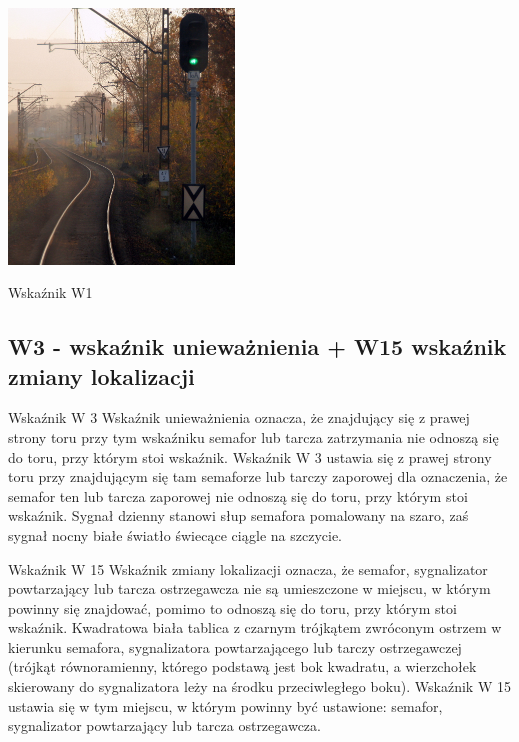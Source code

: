 	\begin{marginfigure}
		\includegraphics[width=6cm]{skryptkierownik-img/skryptkierownik-img004.jpg}
		\caption{Wskaźnik W1}
	\end{marginfigure}

\subsection{W3 - wskaźnik unieważnienia + W15 wskaźnik zmiany lokalizacji}

Wskaźnik W 3 {\textquotedbl}Wskaźnik unieważnienia{\textquotedbl} oznacza, że znajdujący się z prawej strony toru przy
tym wskaźniku semafor lub tarcza zatrzymania nie odnoszą się do toru, przy którym stoi wskaźnik. Wskaźnik W 3 ustawia
się z prawej strony toru przy znajdującym się tam semaforze lub tarczy zaporowej dla oznaczenia, że semafor ten lub
tarcza zaporowej nie odnoszą się do toru, przy którym stoi wskaźnik. Sygnał dzienny stanowi słup semafora pomalowany na
szaro, zaś sygnał nocny białe światło świecące ciągle na szczycie.

Wskaźnik W 15 {\textquotedbl}Wskaźnik zmiany lokalizacji{\textquotedbl} oznacza, że semafor, sygnalizator powtarzający
lub tarcza ostrzegawcza nie są umieszczone w miejscu, w którym powinny się znajdować, pomimo to odnoszą się do toru,
przy którym stoi wskaźnik. Kwadratowa biała tablica z czarnym trójkątem zwróconym ostrzem w kierunku semafora,
sygnalizatora powtarzającego lub tarczy ostrzegawczej (trójkąt równoramienny, którego podstawą jest bok kwadratu, a
wierzchołek skierowany do sygnalizatora leży na środku przeciwległego boku). Wskaźnik W 15 ustawia się w tym miejscu, w
którym powinny być ustawione: semafor, sygnalizator powtarzający lub tarcza ostrzegawcza.


